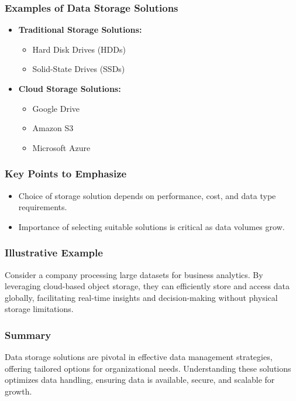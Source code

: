 \documentclass[aspectratio=169]{beamer}
\begin{document}
\begin{frame}[fragile]
    \frametitle{Examples of Data Storage Solutions}
    \begin{itemize}
        \item \textbf{Traditional Storage Solutions:} 
            \begin{itemize}
                \item Hard Disk Drives (HDDs)
                \item Solid-State Drives (SSDs)
            \end{itemize}
        \item \textbf{Cloud Storage Solutions:}
            \begin{itemize}
                \item Google Drive
                \item Amazon S3
                \item Microsoft Azure
            \end{itemize}
    \end{itemize}
\end{frame}

\begin{frame}[fragile]
    \frametitle{Key Points to Emphasize}
    \begin{itemize}
        \item Choice of storage solution depends on performance, cost, and data type requirements.
        \item Importance of selecting suitable solutions is critical as data volumes grow.
    \end{itemize}
\end{frame}

\begin{frame}[fragile]
    \frametitle{Illustrative Example}
    Consider a company processing large datasets for business analytics. By leveraging cloud-based object storage, they can efficiently store and access data globally, facilitating real-time insights and decision-making without physical storage limitations.
\end{frame}

\begin{frame}[fragile]
    \frametitle{Summary}
    Data storage solutions are pivotal in effective data management strategies, offering tailored options for organizational needs. Understanding these solutions optimizes data handling, ensuring data is available, secure, and scalable for growth.
\end{frame}
\end{document}
